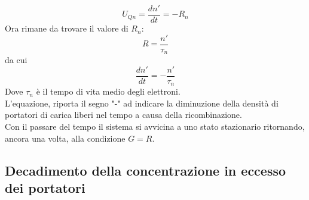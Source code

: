 \begin{equation*}
    U_{Qn}=\dfrac{dn'}{dt}=-R_n
\end{equation*}
Ora rimane da trovare il valore di $R_n$:
\begin{equation*}
    R=\dfrac{n'}{\tau_n}
\end{equation*}
da cui
\begin{equation}
    \dfrac{dn'}{dt}=-\dfrac{n'}{\tau_n}
\end{equation}
%
Dove $\tau_n$ è il tempo di vita medio degli elettroni.\\
L'equazione, riporta il segno "-" ad indicare la diminuzione della densità di portatori di carica liberi nel tempo a causa della ricombinazione.\\
Con il passare del tempo il sistema si avvicina a uno stato stazionario ritornando, ancora una volta, alla condizione $G=R$.\\





\subsection{Decadimento della concentrazione in eccesso dei portatori}

